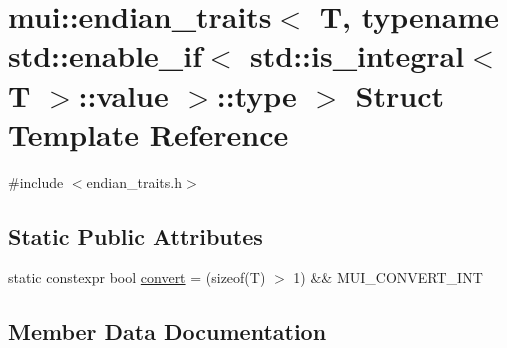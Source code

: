 \hypertarget{structmui_1_1endian__traits_3_01_t_00_01typename_01std_1_1enable__if_3_01std_1_1is__integral_3_017f2a9fc75456eff64bb43276e6e0ef4}{}\section{mui\+:\+:endian\+\_\+traits$<$ T, typename std\+:\+:enable\+\_\+if$<$ std\+:\+:is\+\_\+integral$<$ T $>$\+:\+:value $>$\+:\+:type $>$ Struct Template Reference}
\label{structmui_1_1endian__traits_3_01_t_00_01typename_01std_1_1enable__if_3_01std_1_1is__integral_3_017f2a9fc75456eff64bb43276e6e0ef4}


{\ttfamily \#include $<$endian\+\_\+traits.\+h$>$}

\subsection*{Static Public Attributes}
\begin{DoxyCompactItemize}
\item 
static constexpr bool \hyperlink{structmui_1_1endian__traits_3_01_t_00_01typename_01std_1_1enable__if_3_01std_1_1is__integral_3_017f2a9fc75456eff64bb43276e6e0ef4_a0e63e3bb67c6b38aa88e03750bd68548}{convert} = (sizeof(T) $>$ 1) \&\& M\+U\+I\+\_\+\+C\+O\+N\+V\+E\+R\+T\+\_\+\+I\+NT
\end{DoxyCompactItemize}


\subsection{Member Data Documentation}
\mbox{\label{structmui_1_1endian__traits_3_01_t_00_01typename_01std_1_1enable__if_3_01std_1_1is__integral_3_017f2a9fc75456eff64bb43276e6e0ef4_a0e63e3bb67c6b38aa88e03750bd68548}} 
